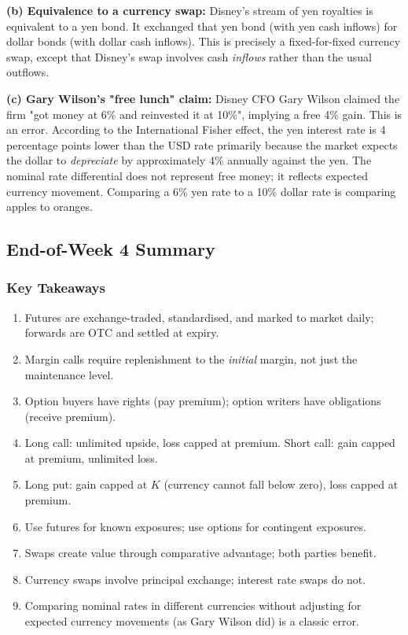 \documentclass[11pt,a4paper]{article}
\begin{document}
\textbf{(b) Equivalence to a currency swap:} Disney's stream of yen royalties is equivalent to a yen bond. It exchanged that yen bond (with yen cash inflows) for dollar bonds (with dollar cash inflows). This is precisely a fixed-for-fixed currency swap, except that Disney's swap involves cash \textit{inflows} rather than the usual outflows.

\textbf{(c) Gary Wilson's "free lunch" claim:} Disney CFO Gary Wilson claimed the firm "got money at 6\% and reinvested it at 10\%", implying a free 4\% gain. This is an error. According to the International Fisher effect, the yen interest rate is 4 percentage points lower than the USD rate primarily because the market expects the dollar to \textit{depreciate} by approximately 4\% annually against the yen. The nominal rate differential does not represent free money; it reflects expected currency movement. Comparing a 6\% yen rate to a 10\% dollar rate is comparing apples to oranges.

\subsection{End-of-Week 4 Summary}

\subsubsection*{Key Takeaways}
\begin{enumerate}
  \item Futures are exchange-traded, standardised, and marked to market daily; forwards are OTC and settled at expiry.
  \item Margin calls require replenishment to the \textit{initial} margin, not just the maintenance level.
  \item Option buyers have rights (pay premium); option writers have obligations (receive premium).
  \item Long call: unlimited upside, loss capped at premium. Short call: gain capped at premium, unlimited loss.
  \item Long put: gain capped at $K$ (currency cannot fall below zero), loss capped at premium.
  \item Use futures for known exposures; use options for contingent exposures.
  \item Swaps create value through comparative advantage; both parties benefit.
  \item Currency swaps involve principal exchange; interest rate swaps do not.
  \item Comparing nominal rates in different currencies without adjusting for expected currency movements (as Gary Wilson did) is a classic error.
\end{enumerate}
\end{document}
